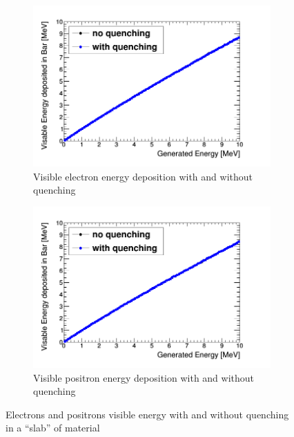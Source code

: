 \begin{figure}[htbp]
\centering
\begin{subfigure}{.5\textwidth}
  \centering
  \includegraphics[width=\linewidth]{quench_eng_LinElectrons.png}
  \captionsetup{width=.9\linewidth}
  \caption{Visible electron energy deposition with and without quenching}
  \label{subFig:electron_quenched_and_not}
\end{subfigure}%
\begin{subfigure}{.5\textwidth}
  \centering
  \includegraphics[width=\linewidth]{quench_eng_LinPositrons.png}
  \captionsetup{width=.9\linewidth}
  \caption{Visible positron energy deposition with and without quenching}
  \label{subFig:positron_quenched_and_not}
\end{subfigure}
\caption{Electrons and positrons visible energy with and without quenching in a ``slab'' of material}
\label{fig:electron_positron_quenched_and_not}
\end{figure}

